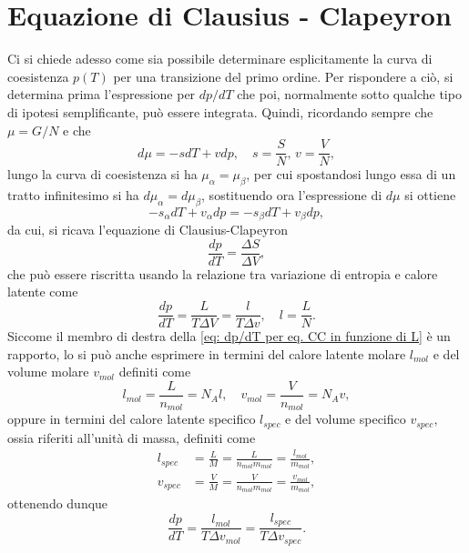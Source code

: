\section{Equazione di Clausius - Clapeyron}
Ci si chiede adesso come sia possibile determinare esplicitamente la curva di coesistenza $p(T)$ per una transizione del primo ordine. Per rispondere a ciò, si determina prima l'espressione per $dp/dT$ che poi, normalmente sotto qualche tipo di ipotesi semplificante, può essere integrata. Quindi, ricordando sempre che $\mu = G/N$ e che 
\begin{equation}
    d\mu = -sdT +vdp,\quad s = \frac{S}{N},\,v = \frac{V}{N},
\end{equation}
lungo la curva di coesistenza si ha $\mu_\alpha = \mu_\beta$, per cui spostandosi lungo essa di un tratto infinitesimo si ha $d\mu_\alpha = d\mu_\beta$, sostituendo ora l'espressione di $d\mu$ si ottiene
\begin{equation}
\label{eq: dp/dT per eq. CC}
    -s_\alpha dT + v_\alpha dp = -s_\beta dT + v_\beta dp,
\end{equation}
da cui, si ricava l'equazione di Clausius-Clapeyron
\begin{equation}
    \frac{dp}{dT} = \frac{\Delta S}{\Delta V},
\end{equation}
che può essere riscritta usando la relazione tra variazione di entropia e calore latente come
\begin{equation}
\label{eq: dp/dT per eq. CC in funzione di L}
    \frac{dp}{dT} = \frac{L}{T\Delta V} = \frac{l}{T\Delta v},\quad l =\frac{L}{N}.
\end{equation}
Siccome il membro di destra della \eqref{eq: dp/dT per eq. CC in funzione di L} è un rapporto, lo si può anche esprimere in termini del calore latente molare $l_{mol}$ e del volume molare $v_{mol}$ definiti come
\begin{equation}
    l_{mol} = \frac{L}{n_{mol}} = N_Al,\quad v_{mol} = \frac{V}{n_{mol}} = N_Av,
\end{equation}
oppure in termini del calore latente specifico $l_{spec}$ e del volume specifico $v_{spec}$, ossia riferiti all'unità di massa, definiti come
\begin{align}
    l_{spec} &= \frac{L}{M} = \frac{L}{n_{mol}m_{mol}} = \frac{l_{mol}}{m_{mol}}, \\
    v_{spec} &= \frac{V}{M} = \frac{V}{n_{mol}m_{mol}} = \frac{v_{mol}}{m_{mol}},
\end{align}
ottenendo dunque
\begin{equation}
    \frac{dp}{dT} = \frac{l_{mol}}{T\Delta v_{mol}} = \frac{l_{spec}}{T\Delta v_{spec}}.
\end{equation}

